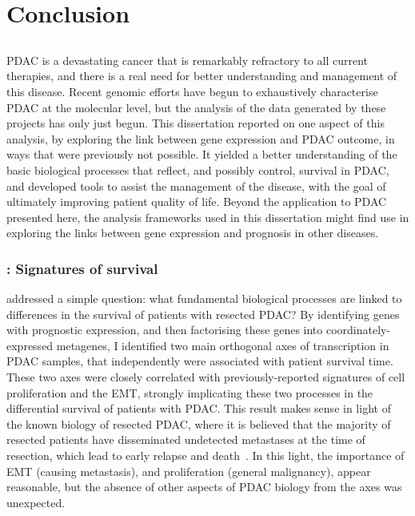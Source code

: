 \documentclass[thesis.tex]{subfiles}
\begin{document}
\chapter[Conclusion]{Conclusion}
\label{chap:conc}

\section*{}

\Acrlong{PDAC} is a devastating cancer that is remarkably refractory to all current therapies, and there is a real need for better understanding and management of this disease.  Recent genomic efforts have begun to exhaustively characterise \gls{PDAC} at the molecular level, but the analysis of the data generated by these projects has only just begun.  This dissertation reported on one aspect of this analysis, by exploring the link between gene expression and \gls{PDAC} outcome, in ways that were previously not possible.  It yielded a better understanding of the basic biological processes that reflect, and possibly control, survival in \gls{PDAC}, and developed tools to assist the management of the disease, with the goal of ultimately improving patient quality of life.  Beyond the application to \gls{PDAC} presented here, the analysis frameworks used in this dissertation might find use in exploring the links between gene expression and prognosis in other diseases.

\subsection{\texorpdfstring{}{Chapter 2}: Signatures of survival}
 addressed a simple question: what fundamental biological processes are linked to differences in the survival of patients with resected \gls{PDAC}?  By identifying genes with prognostic expression, and then factorising these genes into coordinately-expressed metagenes, I identified two main orthogonal axes of transcription in \gls{PDAC} samples, that independently were associated with patient survival time.  These two axes were closely correlated with previously-reported signatures of cell proliferation and the \gls{EMT}, strongly implicating these two processes in the differential survival of patients with \gls{PDAC}.  This result makes sense in light of the known biology of resected \gls{PDAC}, where it is believed that the majority of resected patients have disseminated undetected metastases at the time of resection, which lead to early relapse and death~\cite{Barugola2007}.  In this light, the importance of \gls{EMT} (causing metastasis), and proliferation (general malignancy), appear reasonable, but the absence of other aspects of \gls{PDAC} biology from the axes was unexpected.
\end{document}
